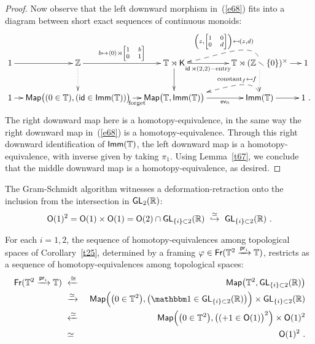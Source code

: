 \begin{proof}
Now observe that the left downward morphism in~(\ref{e68}) fits into a diagram between short exact sequences of continuous monoids:
\begin{equation*}
\xymatrix@C=1em{
1
\ar[r] 
&
\ZZ
\ar@{..>}[d]
\ar[r]^-{b \mapsto \lag 0 \rag \rtimes  { \mbox{\scriptsize$\begin{bmatrix} 1 & b \\ 0 & 1 \end{bmatrix}$}}}
&
\TT \rtimes \sK 
\ar[d]
\ar[rr]_-{\id \rtimes (2,2)-{\rm entry}}
&&
\TT \rtimes (\ZZ \smallsetminus \{0\})^\times
\ar@{..>}[d]
\ar[r]
\ar@{-->}@(u,-)[ll]_-{\left(z, { \mbox{\scriptsize$\begin{bmatrix} 1 & 0 \\ 0 & d \end{bmatrix}$}} \right) \mapsfrom (z, d)  }
&
1
\\
1
\ar[r] 
&
\Map\bigl(
(0\in \TT)
,
(\id \in \Imm(\TT) )
\bigr)
\ar[r]_-{\rm forget}
&
\Map\bigl( \TT , \Imm(\TT) \bigr) 
\ar[rr]_-{ \ev_0 }
&&
\Imm(\TT)
\ar[r]
\ar@{-->}@(u,-)[ll]_-{{\rm constant}_{f} \mapsfrom f}
&
1
~
.
}
\end{equation*}
The right downward map here is a homotopy-equivalence, in the same way the right downward map in~(\ref{e68}) is a homotopy-equivalence.
Through this right downward identification of $\operatorname{\sf Imm}(\mathbb T)$, the left downward map is a homotopy-equivalence, with inverse given by taking $\pi_1$.  
Using Lemma~\ref{t67}, we conclude that the middle downward map is a homotopy-equivalence, as desired.  



\end{proof}


The Gram-Schmidt algorithm witnesses a deformation-retraction onto the inclusion from the intersection in $\operatorname{\sf GL}_2(\mathbb R)$:
\[
\mathsf O(1)^2 = \mathsf O(1)\times \mathsf O(1) = \mathsf O(2) \cap \operatorname{\sf GL}_{\{i\}\subset 2}(\mathbb R)
~\overset{\simeq}\hookrightarrow~ 
\operatorname{\sf GL}_{\{i\}\subset 2}(\mathbb R)
~.
\]

\begin{observation}
\label{prfr}
For each $i=1,2$, the sequence of homotopy-equivalences among topological spaces of Corollary~\ref{t25}, determined by a framing $\varphi \in \operatorname{\sf Fr}(\mathbb T^2 \xrightarrow{\operatorname{\mathsf{pr}}_i} \mathbb T)$, restricts as a sequence of homotopy-equivalences among topological spaces:
\begin{eqnarray*}
\Fr(\TT^2 \xra{\pr_i} \TT)
&
~
\xla{\cong}
~
&
\Map\bigl( \TT^2 , \GL_{\{i\}\subset 2}(\RR) \bigr)
\\
\nonumber
&
~
\xra{\simeq}
~
&
\Map \Bigl( \bigl( 0 \in \TT^2 \bigr) , \bigl( \uno \in \GL_{\{i\}\subset 2}(\RR) \bigr) \Bigr) \times \GL_{\{i\}\subset 2}(\RR)
\\
\nonumber
&
~
\xla{\simeq}
~
&
\Map \Bigl( \bigl( 0 \in \TT^2 \bigr) , \bigl( (+1 \in \sO(1) \bigr)^2 \Bigr) \times \sO(1)^2
\\
\nonumber
&
~\simeq~
&
\sO(1)^2
~.
\end{eqnarray*}

\end{observation}



